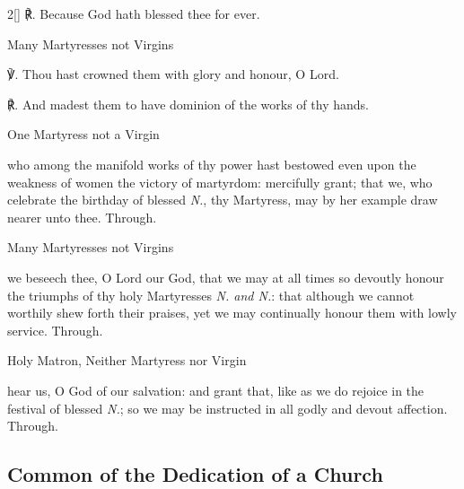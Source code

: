 \begin{paracol}{2}[]
℟. Because God hath blessed thee for ever.


\begin{inhead}
	Many Martyresses not Virgins
\end{inhead}
℣. Thou hast crowned them with glory and honour, O Lord.

℟. And madest them to have dominion of the works of thy hands.


\fussy
\end{paracol}

\clearpage\label{CommonHolyMatronsCollect}
\collect
\begin{inhead}
	One Martyress not a Virgin
\end{inhead}
 who among the manifold works of thy power hast bestowed even upon the weakness of women the victory of martyrdom: mercifully grant; that we, who celebrate the birthday of blessed \textit{N.}, thy Martyress, may by her example draw nearer unto thee. Through.

\begin{inhead}
	Many Martyresses not Virgins
\end{inhead}
 we beseech thee, O Lord our God, that we may at all times so devoutly honour the triumphs of thy holy Martyresses \textit{N. and N.}: that although we cannot worthily shew forth their praises, yet we may continually honour them with lowly service. Through.

\begin{inhead}
	Holy Matron, Neither Martyress nor Virgin
\end{inhead}
 hear us, O God of our salvation: and grant that, like as we do rejoice in the festival of blessed \textit{N.}; so we may be instructed in all godly and devout affection. Through.


\subsection{Common of the Dedication of a Church}\label{CommonDedication}

